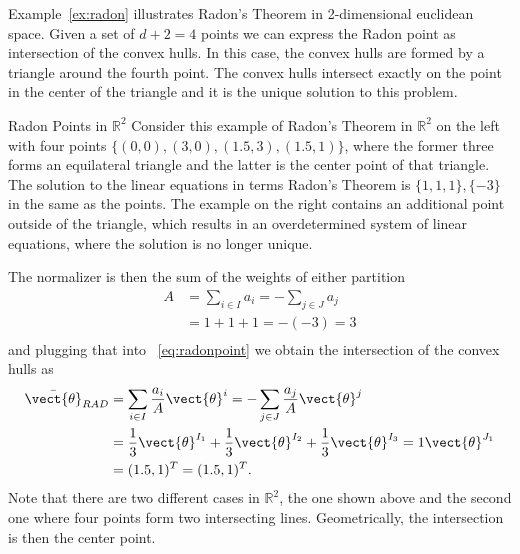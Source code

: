 Example~\ref{ex:radon} illustrates Radon's Theorem in 2-dimensional euclidean space.
Given a set of $d+2 =4$ points we can express the Radon point as intersection of the convex hulls.
In this case, the convex hulls are formed by a triangle around the fourth point.
The convex hulls intersect exactly on the point in the center of the triangle and it is the unique solution to this problem.

\begin{example}{Radon Points in $\mathbb{R}^2$}
    \label{ex:radon}
    Consider this example of Radon's Theorem in $\mathbb{R}^2$ on the left with four points $\{(0,0), (3,0), (1.5, 3), (1.5,1)\}$, where the former three forms an equilateral triangle and the latter is the center point of that triangle.
    The solution to the linear equations in terms Radon's Theorem is $\{1,1,1\},\{-3\}$ in the same as the points. 
    The example on the right contains an additional point outside of the triangle, which results in an overdetermined system of linear equations, where the solution is no longer unique.
    
     
    The normalizer is then the sum of the weights of either partition
    \begin{equation}
        \begin{split}
            A &= \sum_{i\in I} a_i = - \sum_{j \in J} a_j \\
            &= 1 + 1 + 1 = -(-3) = 3 \\
        \end{split}
    \end{equation}
    and plugging that into \eq~\ref{eq:radonpoint} we obtain the intersection of the convex hulls as
    \begin{equation}
        \begin{split}
            \bar{\vect{\theta}}_{RAD} &= \sum_{i\in I} \frac{a_i}{A} \vect{\theta}^i = - \sum_{j \in J} \frac{a_j}{A} \vect{\theta}^j \\
            &= \frac{1}{3} \vect{\theta}^{I_1} + \frac{1}{3} \vect{\theta}^{I_2} + \frac{1}{3} \vect{\theta}^{I_3} = 1 \vect{\theta}^{J_1} \\
            & =  (1.5, 1)^T = (1.5, 1)^T.
        \end{split}
    \end{equation}
    Note that there are two different cases in $\mathbb{R}^2$, the one shown above and the second one where four points form two intersecting lines. Geometrically, the intersection is then the center point.

\end{example}
   

